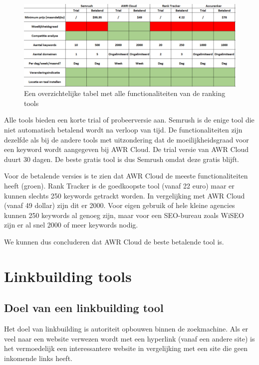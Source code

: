 \begin{figure}[h!]
\centering
\includegraphics[width=\linewidth]{img/rankingtabel.PNG}
\caption{Een overzichtelijke tabel met alle functionaliteiten van de ranking tools}
\end{figure}

Alle tools bieden een korte trial of probeerversie aan. Semrush is de enige tool die niet automatisch betalend wordt na verloop van tijd. De functionaliteiten zijn dezelfde als bij de andere tools met uitzondering dat de moeilijkheidsgraad voor een keyword wordt aangegeven bij AWR Cloud. De trial versie van AWR Cloud duurt 30 dagen. De beste gratis tool is dus Semrush omdat deze gratis blijft. 

Voor de betalende versies is te zien dat AWR Cloud de meeste functionaliteiten heeft (groen). Rank Tracker is de goedkoopste tool (vanaf 22 euro) maar er kunnen slechts 250 keywords getrackt worden. In vergelijking met AWR Cloud (vanaf 49 dollar) zijn dit er 2000. Voor eigen gebruik of hele kleine agencies kunnen 250 keywords al genoeg zijn, maar voor een SEO-bureau zoals WiSEO zijn er al snel 2000 of meer keywords nodig. 

We kunnen dus concluderen dat AWR Cloud de beste betalende tool is. 

\section{Linkbuilding tools}
\label{ch: Linkbuilding tools}

\subsection{Doel van een linkbuilding tool}
\label{ch: Doel van een linkbuilding tool}

Het doel van linkbuilding is autoriteit opbouwen binnen de zoekmachine. Als er veel naar een website verwezen wordt met een hyperlink (vanaf een andere site) is het vermoedelijk een interessantere website in vergelijking met een site die geen inkomende links heeft. 

